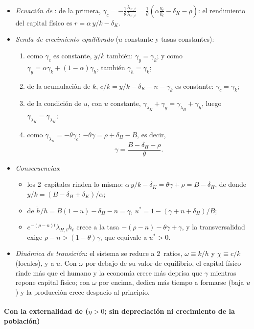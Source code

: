 \documentclass[11pt]{article}
\begin{document}
\begin{itemize}
\item \emph{Ecuación de }: de la primera, $\gamma_c=-\frac{1}{\theta}\frac{\dot\lambda_{K,t}}{\lambda_{K,t}}=\frac{1}{\theta}\left(\alpha\frac{y_t}{k_t}-\delta_K-\rho\right)$: el rendimiento del capital físico es $r=\alpha\,y/k-\delta_K$.
\item \emph{Senda de crecimiento equilibrado} ($u$ constante y tasas constantes):
  \begin{enumerate}
  \item como $\gamma_c$ es constante, $y/k$ también: $\gamma_y=\gamma_k$; y como $\gamma_y=\alpha\gamma_k+(1-\alpha)\gamma_h$, también $\gamma_h=\gamma_k$;
  \item de la acumulación de $k$, $c/k=y/k-\delta_K-n-\gamma_k$ es constante: $\gamma_c=\gamma_k$;
  \item de la condición de $u$, con $u$ constante, $\gamma_{\lambda_K}+\gamma_y=\gamma_{\lambda_H}+\gamma_h$, luego $\gamma_{\lambda_K}=\gamma_{\lambda_H}$;
  \item como $\gamma_{\lambda_K}=-\theta\gamma_c$: $-\theta\gamma=\rho+\delta_H-B$, es decir,
  \[\gamma=\frac{B-\delta_H-\rho}{\theta}.\]
  \end{enumerate}
\item \emph{Consecuencias}:
  \begin{itemize}
  \item los 2~capitales rinden lo mismo: $\alpha\,y/k-\delta_K=\theta\gamma+\rho=B-\delta_H$, de donde $y/k=(B-\delta_H+\delta_K)/\alpha$;
  \item de $\dot h/h=B(1-u)-\delta_H-n=\gamma$, $u^*=1-(\gamma+n+\delta_H)/B$;
  \item $e^{-(\rho-n)t}\lambda_{H,t}h_t$ crece a la tasa $-(\rho-n)-\theta\gamma+\gamma$, y la transversalidad exige $\rho-n>(1-\theta)\gamma$, que equivale a $u^*>0$. \findemo
  \end{itemize}
\item \emph{Dinámica de transición}: el sistema se reduce a 2~ratios, $\omega\equiv k/h$ y $\chi\equiv c/k$ (locales), y a $u$. Con $\omega$ por debajo de su valor de equilibrio, el capital físico rinde más que el humano y la economía crece más deprisa que $\gamma$ mientras repone capital físico; con $\omega$ por encima, dedica más tiempo a formarse (baja $u$) y la producción crece despacio al principio\nocite{BarroSalaiMartin2004}.
\end{itemize}

\paragraph{Con la externalidad de  ($\eta>0$; sin depreciación ni crecimiento de la población)}
\end{document}
